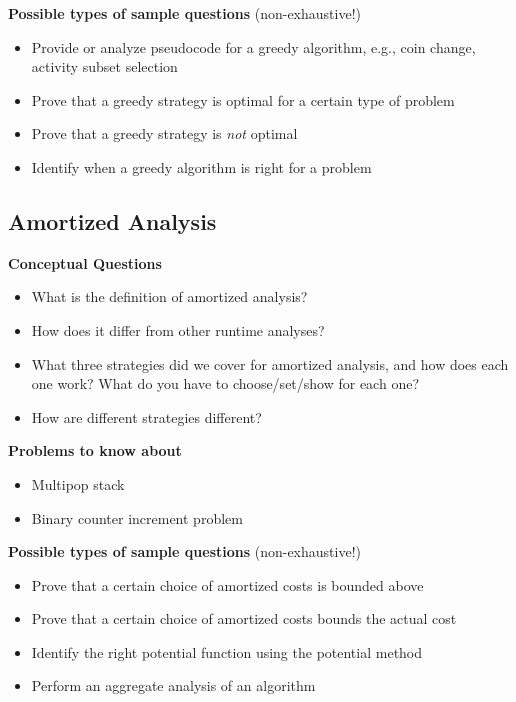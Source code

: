\documentclass[11  pt]{exam}
\begin{document}
	\textbf{Possible types of sample questions} (non-exhaustive!)
	\begin{itemize}
		\item Provide or analyze pseudocode for a greedy algorithm, e.g., coin change, activity subset selection
		\item Prove that a greedy strategy is optimal for a certain type of problem
		\item Prove that a greedy strategy is \emph{not} optimal
		\item Identify when a greedy algorithm is right for a problem
	\end{itemize}
	
	\subsection{Amortized Analysis}
	\textbf{Conceptual Questions}
	\begin{itemize}
		\item What is the definition of amortized analysis?
		\item How does it differ from other runtime analyses?
		\item What three strategies did we cover for amortized analysis, and how does each one work? What do you have to choose/set/show for each one?
		\item How are different strategies different?
	\end{itemize}
	
	\textbf{Problems to know about}
	\begin{itemize}
		\item Multipop stack
		\item Binary counter increment problem
	\end{itemize}
	
	\textbf{Possible types of sample questions} (non-exhaustive!)
	\begin{itemize}
		\item Prove that a certain choice of amortized costs is bounded above
		\item Prove that a certain choice of amortized costs bounds the actual cost
		\item Identify the right potential function using the potential method
		\item Perform an aggregate analysis of an algorithm
	\end{itemize}
	
\end{document}
